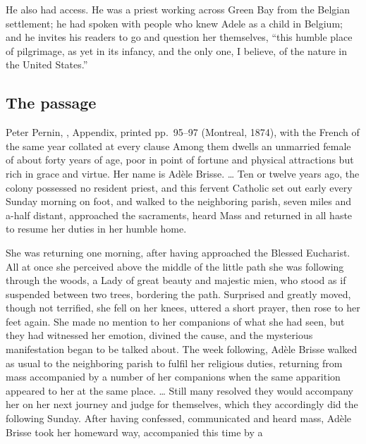 He also had access. He was a priest working across Green Bay from the
Belgian settlement; he had spoken with people who knew Adele as a child
in Belgium; and he invites his readers to go and question her
themselves, ``this humble place of pilgrimage, as yet in its infancy,
and the only one, I believe, of the nature in the United
States.''

\subsection{The passage}

\begin{witnesstext}{Peter Pernin, ,
Appendix, printed pp.~95--97 (Montreal, 1874), with the French of the
same year collated at every clause}
Among them dwells an unmarried female of about forty years of age, poor
in point of fortune and physical attractions but rich in grace and
virtue. Her name is Ad\`ele Brisse. \dots{} Ten or twelve years ago,
the colony possessed no resident priest, and this fervent Catholic set
out early every Sunday morning on foot, and walked to the neighboring
parish, seven miles and a-half distant, approached the sacraments,
heard Mass and returned in all haste to resume her duties in her humble
home.\par
She was returning one morning, after having approached the Blessed
Eucharist. All at once she perceived above the middle of the little
path she was following through the woods, a Lady of great beauty and
majestic mien, who stood as if suspended between two trees, bordering
the path. Surprised and greatly moved, though not terrified, she fell
on her knees, uttered a short prayer, then rose to her feet again. She
made no mention to her companions of what she had seen, but they had
witnessed her emotion, divined the cause, and the mysterious
manifestation began to be talked about. The week following, Ad\`ele
Brisse walked as usual to the neighboring parish to fulfil her
religious duties, returning from mass accompanied by a number of her
companions when the same apparition appeared to her at the same place.
\dots{} Still many resolved they would accompany her on her next
journey and judge for themselves, which they accordingly did the
following Sunday. After having confessed, communicated and heard mass,
Ad\`ele Brisse took her homeward way, accompanied this time by a

\end{witnesstext}
